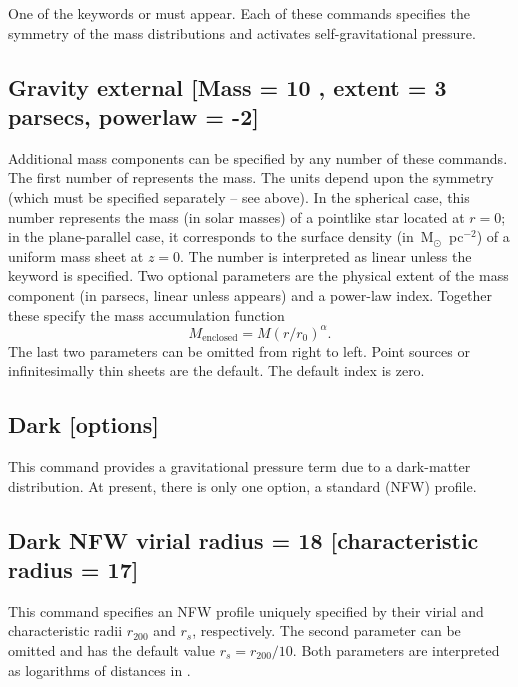 One of the keywords  or  
must appear.  Each of these commands specifies the symmetry of the mass distributions
and activates self-gravitational pressure.

\subsection{Gravity external [Mass = 10 {\Msun}, extent = 3 parsecs, powerlaw = -2]}

Additional mass components can be specified by any number of 
these commands.
The first number of represents the mass.  
The units depend upon the symmetry
(which must be specified separately -- see above).
In the spherical case, this number represents the mass (in solar masses) 
of a pointlike star located at $r=0$; in the plane-parallel case, 
it corresponds to the surface density (in~M$_\odot$~pc$^{-2}$) of a uniform
mass sheet at $z=0$.
The number is interpreted as linear 
unless the keyword  is specified.
Two optional parameters are the physical
extent of the mass component (in parsecs, linear unless  appears)
and a power-law index.  Together these specify the mass accumulation function
\begin{equation}
M_{\mathrm{enclosed}} = M (r/r_0)^\alpha.
\end{equation}
The last two parameters can be omitted from right to left.  
Point sources or infinitesimally thin sheets are the default.
The default index is zero.

\begin{shaded}
\section{\experimental Dark [options]}
This command provides a gravitational pressure term due to a dark-matter
distribution.  At present, there is only one option, a standard
\citet{NFW96} (NFW) profile.

\subsection{Dark NFW virial radius = 18 [characteristic radius = 17]}
This command specifies an NFW profile uniquely specified by their 
virial and characteristic radii $r_{200}$ and $r_s$, respectively.
The second parameter can be omitted and has the
default value $r_s=r_{200}/10.$ Both parameters are interpreted as 
logarithms of distances in \cm.
\end{shaded}

